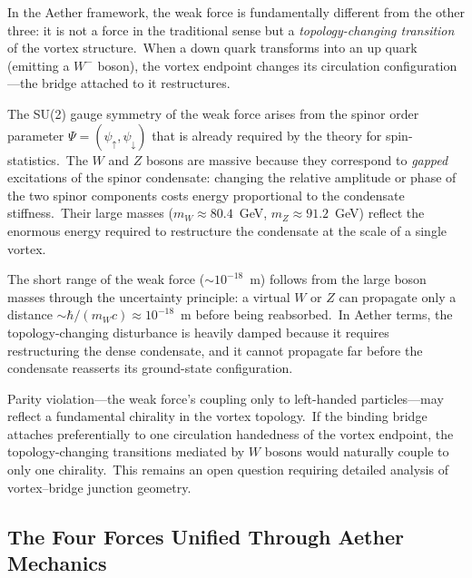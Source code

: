 ﻿\documentclass[12pt,letterpaper]{article}
\begin{document}
In the Aether framework, the weak force is fundamentally different from the other three:
it is not a force in the traditional sense but a \emph{topology-changing transition}
of the vortex structure.\ When a down quark transforms into an up quark (emitting a
$W^-$ boson), the vortex endpoint changes its circulation configuration---the bridge
attached to it restructures.

The SU(2) gauge symmetry of the weak force arises from the spinor order parameter
$\Psi = (\psi_\uparrow, \psi_\downarrow)$ that is already required by the theory
for spin-statistics.\ The $W$ and $Z$ bosons are massive because they correspond to
\emph{gapped} excitations of the spinor condensate: changing the relative amplitude
or phase of the two spinor components costs energy proportional to the condensate
stiffness.\ Their large masses ($m_W \approx 80.4$~GeV, $m_Z \approx 91.2$~GeV)
reflect the enormous energy required to restructure the condensate at the scale
of a single vortex.

The short range of the weak force ($\sim 10^{-18}$~m) follows from the large boson
masses through the uncertainty principle: a virtual $W$ or $Z$ can propagate only
a distance $\sim \hbar / (m_W c) \approx 10^{-18}$~m before being reabsorbed.\ In
Aether terms, the topology-changing disturbance is heavily damped because it
requires restructuring the dense condensate, and it cannot propagate far before
the condensate reasserts its ground-state configuration.

Parity violation---the weak force's coupling only to left-handed particles---may
reflect a fundamental chirality in the vortex topology.\ If the binding bridge
attaches preferentially to one circulation handedness of the vortex endpoint,
the topology-changing transitions mediated by $W$ bosons would naturally couple
to only one chirality.\ This remains an open question requiring detailed analysis
of vortex--bridge junction geometry.


\subsection{The Four Forces Unified Through Aether Mechanics}
\end{document}
